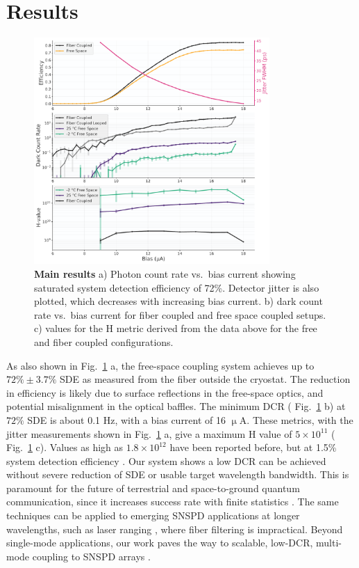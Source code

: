 \documentclass[11pt]{caltech_thesis} %
\begin{document}
\hypertarget{results}{%
\section{Results}\label{results}}

\hypertarget{fig:main_data}{%
\begin{figure}
\centering
\includegraphics[width=0.8\textwidth,height=\textheight]{./chapter_02/figs/thesis_main_data_light.pdf}
\caption[{Main results}]{\textbf{Main results} a) Photon count rate vs.~bias current showing saturated system detection efficiency of 72\%. Detector jitter is also plotted, which decreases with increasing bias current. b) dark count rate vs.~bias current for fiber coupled and free space coupled setups. c) values for the H metric derived from the data above for the free and fiber coupled configurations.}
\label{fig:main_data}
\end{figure}
}

As also shown in Fig.~\ref{fig:main_data} a, the free-space coupling system achieves up to $72 \% \pm 3.7 \%$ SDE as measured from the fiber outside the cryostat. The reduction in efficiency is likely due to surface reflections in the free-space optics, and potential misalignment in the optical baffles. The minimum DCR ( Fig.~\ref{fig:main_data} b) at $72 \%$ SDE is about 0.1 Hz, with a bias current of 16 $\mathrm{\upmu A}$. These metrics, with the jitter measurements shown in Fig.~\ref{fig:main_data} a, give a maximum H value of $5 \times 10^{11}$ ( Fig.~\ref{fig:main_data} c). Values as high as $1.8 \times 10^{12}$ have been reported before, but at 1.5\% system detection efficiency \autocite{Shibata2015}. Our system shows a low DCR can be achieved without severe reduction of SDE or usable target wavelength bandwidth. This is paramount for the future of terrestrial and space-to-ground quantum communication, since it increases success rate with finite statistics \autocite{Boaron2018secure}. The same techniques can be applied to emerging SNSPD applications at longer wavelengths, such as laser ranging \autocite{Taylor2019}, where fiber filtering is impractical. Beyond single-mode applications, our work paves the way to scalable, low-DCR, multi-mode coupling to SNSPD arrays \autocite{Wollman2019}.
\end{document}
